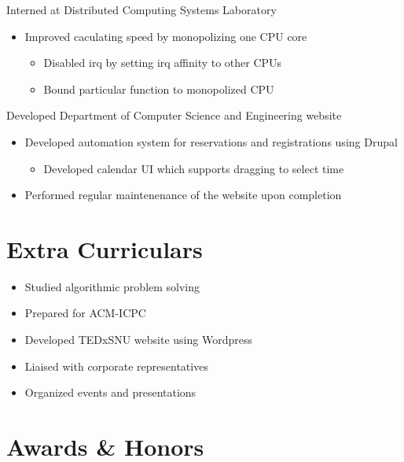 \documentclass[11pt,a4paper,sans]{moderncv}        %
\begin{document}
{Interned at Distributed Computing Systems Laboratory
  \begin{itemize}%
    \item Improved caculating speed by monopolizing one CPU core
      \begin{itemize}
        \item Disabled irq by setting irq affinity to other CPUs
        \item Bound particular function to monopolized CPU
      \end{itemize}
\end{itemize}}

{Developed Department of Computer Science and Engineering website
  \begin{itemize}%
    \item Developed automation system for reservations and registrations using Drupal
      \begin{itemize}%
        \item Developed calendar UI which supports dragging to select time
      \end{itemize}
    \item Performed regular maintenenance of the website upon completion
\end{itemize}}

\section{Extra Curriculars}
{\begin{itemize}%
    \item Studied algorithmic problem solving
    \item Prepared for ACM-ICPC
\end{itemize}}

{\begin{itemize}%
    \item Developed TEDxSNU website using Wordpress
    \item Liaised with corporate representatives
    \item Organized events and presentations
\end{itemize}}

\section{Awards \& Honors}
\end{document}
